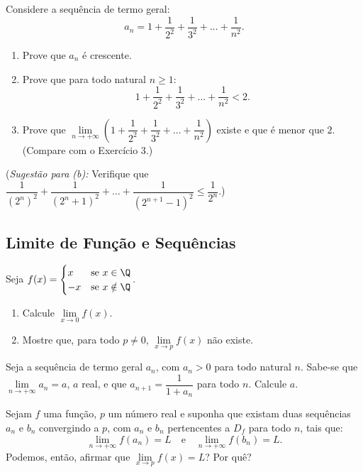 \begin{exercicio}[9]
Considere a sequência de termo geral:
\[
a_n = 1 + \dfrac{1}{2^2} + \dfrac{1}{3^2} + \dots + \dfrac{1}{n^2}.
\]
\begin{enumerate}[label=\alph*)]
    \item Prove que $a_n$ é crescente.
    \item Prove que para todo natural $n \ge 1$:
    \[
    1 + \dfrac{1}{2^2} + \dfrac{1}{3^2} + \dots + \dfrac{1}{n^2} < 2.
    \]
    \item Prove que $\lim\limits_{n \to +\infty} \left(1 + \dfrac{1}{2^2} + \dfrac{1}{3^2} + \dots + \dfrac{1}{n^2}\right)$ existe e que é menor que $2$. (Compare com o Exercício 3.)
\end{enumerate}
(\textit{Sugestão para (b):} Verifique que $\dfrac{1}{(2^n)^2} + \dfrac{1}{(2^n + 1)^2} + \dots + \dfrac{1}{(2^{n+1} - 1)^2} \le \dfrac{1}{2^n}$.)
\end{exercicio}

\clearpage

\subsection{Limite de Função e Sequências}

\begin{exercicio}[1]
Seja $f(x) = \begin{cases} x & \text{se } x \in \Q \\ -x & \text{se } x \notin \Q \end{cases}$.
\begin{enumerate}[label=\alph*)]
    \item Calcule $\lim\limits_{x \to 0} f(x)$.
    \item Mostre que, para todo $p \neq 0$, $\lim\limits_{x \to p} f(x)$ não existe.
\end{enumerate}
\end{exercicio}

\begin{exercicio}[2]
Seja a sequência de termo geral $a_n$, com $a_n > 0$ para todo natural $n$. Sabe-se que $\lim\limits_{n \to +\infty} a_n = a$, $a$ real, e que $a_{n+1} = \dfrac{1}{1 + a_n}$ para todo $n$. Calcule $a$.
\end{exercicio}

\begin{exercicio}[3]
Sejam $f$ uma função, $p$ um número real e suponha que existam duas sequências $a_n$ e $b_n$ convergindo a $p$, com $a_n$ e $b_n$ pertencentes a $D_f$ para todo $n$, tais que:
\[
\lim_{n \to +\infty} f(a_n) = L \quad\text{e}\quad \lim_{n \to +\infty} f(b_n) = L.
\]
Podemos, então, afirmar que $\lim\limits_{x \to p} f(x) = L$? Por quê?
\end{exercicio}

